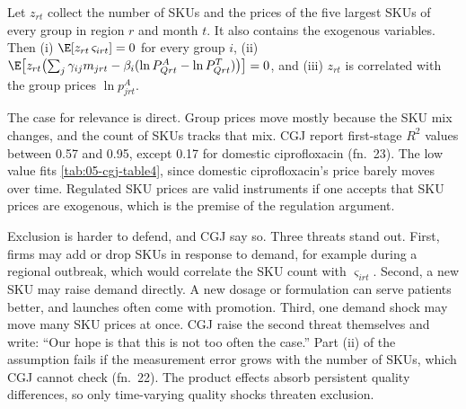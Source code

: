 \begin{assumption}\label{ass:05-cgj-iv}
Let $z_{rt}$ collect the number of SKUs and the prices of the five largest SKUs of every group in region $r$ and month
$t$. It also contains the exogenous variables. Then (i) $\E[z_{rt}\,\varsigma_{irt}] = 0$ for every group $i$, (ii)
$\E\bigl[z_{rt}\bigl(\sum_j\gamma_{ij}m_{jrt} - \beta_i(\ln P_{Qrt}^A - \ln P_{Qrt}^T)\bigr)\bigr] = 0$, and (iii)
$z_{rt}$ is correlated with the group prices $\ln p_{jrt}^A$.
\end{assumption}

The case for relevance is direct. Group prices move mostly because the SKU mix changes, and the count of SKUs tracks
that mix. CGJ report first-stage $R^2$ values between 0.57 and 0.95, except 0.17 for domestic ciprofloxacin (fn.~23).
The low value fits \cref{tab:05-cgj-table4}, since domestic ciprofloxacin's price barely moves over time. Regulated SKU
prices are valid instruments if one accepts that SKU prices are exogenous, which is the premise of the regulation
argument.

Exclusion is harder to defend, and CGJ say so. Three threats stand out. First, firms may add or drop SKUs in response
to demand, for example during a regional outbreak, which would correlate the SKU count with $\varsigma_{irt}$. Second,
a new SKU may raise demand directly. A new dosage or formulation can serve patients better, and launches often come
with promotion. Third, one demand shock may move many SKU prices at once. CGJ raise the second threat themselves
and write: ``Our hope is that this is not too often the case.'' Part (ii) of the assumption fails if the measurement error grows with
the number of SKUs, which CGJ cannot check (fn.~22). The product effects absorb persistent quality differences, so only
time-varying quality shocks threaten exclusion.

